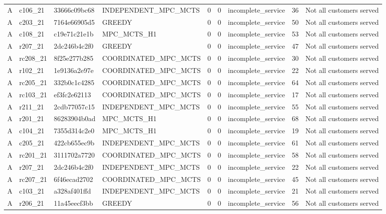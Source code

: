 \begin{table}
{\begin{tabular}{llllrrlrl}
A & c106\_21 & 33666c09bc68 & INDEPENDENT\_MPC\_MCTS & 0 & 0 & incomplete\_service & 36 & Not all customers served \\
A & c203\_21 & 7164e66905d5 & GREEDY & 0 & 0 & incomplete\_service & 50 & Not all customers served \\
A & c108\_21 & c19e71c21e1b & MPC\_MCTS\_H1 & 0 & 0 & incomplete\_service & 53 & Not all customers served \\
A & r207\_21 & 2dc246b4c2f0 & GREEDY & 0 & 0 & incomplete\_service & 47 & Not all customers served \\
A & rc208\_21 & 8f25e277b285 & COORDINATED\_MPC\_MCTS & 0 & 0 & incomplete\_service & 30 & Not all customers served \\
A & r102\_21 & 1e9136a2e97e & COORDINATED\_MPC\_MCTS & 0 & 0 & incomplete\_service & 22 & Not all customers served \\
A & rc205\_21 & 332b0c1c4285 & COORDINATED\_MPC\_MCTS & 0 & 0 & incomplete\_service & 64 & Not all customers served \\
A & rc103\_21 & ef3fc2e62113 & COORDINATED\_MPC\_MCTS & 0 & 0 & incomplete\_service & 17 & Not all customers served \\
A & r211\_21 & 2cdb77057c15 & INDEPENDENT\_MPC\_MCTS & 0 & 0 & incomplete\_service & 55 & Not all customers served \\
A & r201\_21 & 86283904b0ad & MPC\_MCTS\_H1 & 0 & 0 & incomplete\_service & 68 & Not all customers served \\
A & c104\_21 & 7355d314c2e0 & MPC\_MCTS\_H1 & 0 & 0 & incomplete\_service & 19 & Not all customers served \\
A & c205\_21 & 422cb655ec9b & INDEPENDENT\_MPC\_MCTS & 0 & 0 & incomplete\_service & 61 & Not all customers served \\
A & rc201\_21 & 3111702a7720 & COORDINATED\_MPC\_MCTS & 0 & 0 & incomplete\_service & 58 & Not all customers served \\
A & r207\_21 & 2dc246b4c2f0 & INDEPENDENT\_MPC\_MCTS & 0 & 0 & incomplete\_service & 22 & Not all customers served \\
A & rc207\_21 & 6f46ecad2702 & COORDINATED\_MPC\_MCTS & 0 & 0 & incomplete\_service & 45 & Not all customers served \\
A & c103\_21 & a328af401ffd & INDEPENDENT\_MPC\_MCTS & 0 & 0 & incomplete\_service & 21 & Not all customers served \\
A & r206\_21 & 11a45eecf3bb & GREEDY & 0 & 0 & incomplete\_service & 56 & Not all customers served \\

\end{tabular}}
\end{table}
